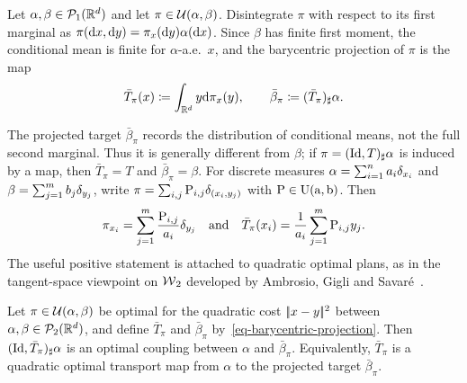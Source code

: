 \begin{defn}\label{def-barycentric-projection}
	Let $\alpha,\beta\in\mathcal{P}_1(\mathbb{R}^d)$ and let $\pi\in\mathcal{U}(\alpha,\beta)$. Disintegrate $\pi$ with respect to its first marginal as
	$\pi(\mathrm{d} x,\mathrm{d} y)=\pi_x(\mathrm{d} y)\alpha(\mathrm{d} x)$. Since $\beta$ has finite first moment, the conditional mean is finite for $\alpha$-a.e.\ $x$, and the barycentric projection of $\pi$ is the map
	\begin{equation}\label{eq-barycentric-projection}
		\bar T_\pi(x)
		\coloneqq
		\int_{\mathbb{R}^d}y\mathrm{d}\pi_x(y),
		\qquad
		\bar\beta_\pi
		\coloneqq
		(\bar T_\pi)_\sharp\alpha.
	\end{equation}
\end{defn}
The projected target $\bar\beta_\pi$ records the distribution of conditional means, not the full second marginal. Thus it is generally different from $\beta$; if $\pi=(\mathrm{Id},T)_\sharp\alpha$ is induced by a map, then $\bar T_\pi=T$ and $\bar\beta_\pi=\beta$. For discrete measures $\alpha=\sum_{i=1}^n a_i\delta_{x_i}$ and $\beta=\sum_{j=1}^m b_j\delta_{y_j}$, write $\pi=\sum_{i,j}\mathrm{P}_{i,j}\delta_{(x_i,y_j)}$ with $\mathrm{P}\in\mathrm{U}(\mathrm{a},\mathrm{b})$. Then
\[
	\pi_{x_i}=\sum_{j=1}^m\frac{\mathrm{P}_{i,j}}{a_i}\delta_{y_j}
	\quad \text{and} \quad
	\bar T_\pi(x_i)=\frac{1}{a_i}\sum_{j=1}^m\mathrm{P}_{i,j}y_j.
\]
The useful positive statement is attached to quadratic optimal plans, as in the tangent-space viewpoint on $\operatorname{\mathcal{W}}_2$ developed by Ambrosio, Gigli and Savar{\'e}~\cite[Chap.~7]{ambrosio2006gradient}.

\begin{prop}\label{prop-barycentric-projection-optimal}
	Let $\pi\in\mathcal{U}(\alpha,\beta)$ be optimal for the quadratic cost $|\!| x-y |\!|^2$ between $\alpha,\beta\in\mathcal{P}_2(\mathbb{R}^d)$, and define $\bar T_\pi$ and $\bar\beta_\pi$ by~\eqref{eq-barycentric-projection}. Then $(\mathrm{Id},\bar T_\pi)_\sharp\alpha$ is an optimal coupling between $\alpha$ and $\bar\beta_\pi$. Equivalently, $\bar T_\pi$ is a quadratic optimal transport map from $\alpha$ to the projected target $\bar\beta_\pi$.
\end{prop}

